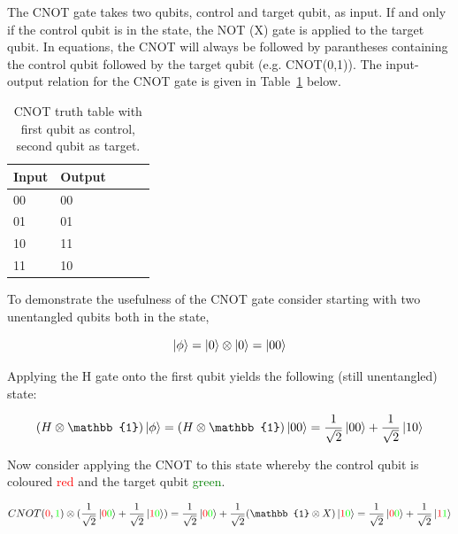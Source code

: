 The CNOT gate takes two qubits, control and target qubit, as input. If and only if the control qubit is in the \1 state, the NOT (X) gate is applied to the target qubit. In equations, the CNOT will always be followed by parantheses containing the control qubit followed by the target qubit (e.g. CNOT(0,1)). The input-output relation for the CNOT gate is given in Table~\ref{tab:cnottruthtable} below.

\begin{table}[ht!]
\begin{center}
\caption{CNOT truth table with first qubit as control, second qubit as target.}\vspace{1ex}
\label{tab:cnottruthtable}
\begin{tabular}{llccc}\hline
Input & Output \\ \hline
00 & 00 \\
01 & 01 \\
10 & 11 \\
11 & 10 \\ \hline
\end{tabular}
\end{center}
\end{table}

To demonstrate the usefulness of the CNOT gate consider starting with two unentangled qubits both in the \0 state,

\begin{equation}
\ket{\phi} = \ket{0} \otimes \ket{0} = \ket{00}
\end{equation}

Applying the H gate onto the first qubit yields the following (still unentangled) state:

\begin{equation}
(H \otimes \mathbb{1}) \ket{\phi} = (H \otimes \mathbb{1}) \ket{00} = \frac{1}{\sqrt{2}} \ket{00} + \frac{1}{\sqrt{2}} \ket{10} 
\end{equation}

Now consider applying the CNOT to this state whereby the control qubit is coloured \textcolor{red}{red} and the target qubit \textcolor{green}{green}.

\begin{equation}
\label{equ:cnotexamples}
CNOT(\textcolor{red}{0},\textcolor{green}{1}) \otimes (\frac{1}{\sqrt{2}} \ket{\textcolor{red}{0}\textcolor{green}{0}} + \frac{1}{\sqrt{2}} \ket{\textcolor{red}{1}\textcolor{green}{0}}) = \frac{1}{\sqrt{2}} \ket{\textcolor{red}{0}\textcolor{green}{0}} + \frac{1}{\sqrt{2}} (\mathbb{1} \otimes X) \ket{\textcolor{red}{1}\textcolor{green}{0}} = \frac{1}{\sqrt{2}} \ket{\textcolor{red}{0}\textcolor{green}{0}} + \frac{1}{\sqrt{2}} \ket{\textcolor{red}{1}\textcolor{green}{1}}
\end{equation}


